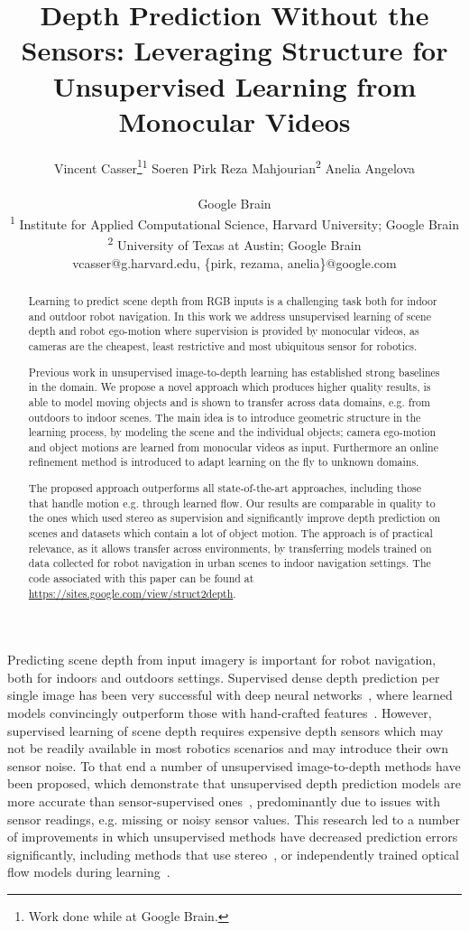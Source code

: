 \documentclass[letterpaper]{article} \usepackage{aaai19}  \usepackage{times}  \usepackage{helvet}  \usepackage{courier}  \usepackage{url}  \usepackage{graphicx}  \frenchspacing
\title{Depth Prediction Without the Sensors: Leveraging Structure for Unsupervised Learning from Monocular Videos}
\author{Vincent Casser\thanks{Work done while at Google Brain.}\textsuperscript{1} \hspace{20pt} Soeren Pirk \hspace{20pt} Reza Mahjourian\textsuperscript{2} \hspace{20pt} Anelia Angelova\\\\
Google Brain\\
\textsuperscript{1} Institute for Applied Computational Science, Harvard University; Google Brain\\
\textsuperscript{2} University of Texas at Austin; Google Brain\\
vcasser@g.harvard.edu, \{pirk, rezama, anelia\}@google.com
}
\begin{document}
\maketitle

\begin{abstract}
Learning to predict scene depth from RGB inputs is a challenging task both for indoor and outdoor robot navigation. In this work we address unsupervised learning of scene depth and robot ego-motion where  supervision is provided by monocular videos, as cameras are the cheapest, least restrictive and most ubiquitous sensor for robotics.

Previous work in unsupervised image-to-depth learning has established strong baselines in the domain. We propose a novel approach which produces higher quality results, is able to model moving objects and is shown to transfer across data domains, e.g. from outdoors to indoor scenes. The main idea is to introduce geometric structure in the learning process, by modeling the scene and the individual objects; camera ego-motion and object motions are learned from monocular videos as input. Furthermore an online refinement method is introduced to adapt learning on the fly to unknown domains.

The proposed approach outperforms all state-of-the-art approaches, including those that handle motion e.g. through learned flow. Our results are comparable in quality to the ones which used stereo as supervision and significantly improve depth prediction on scenes and datasets which contain a lot of object motion. The approach is of practical relevance, as it allows transfer across environments, by transferring models trained on data collected for robot navigation in urban scenes to indoor navigation settings. The code associated with this paper can be found at \url{https://sites.google.com/view/struct2depth}.
\end{abstract}

\noindent Predicting scene depth from input imagery is important for robot navigation, both for indoors and outdoors settings.  
Supervised dense depth prediction per single image has been very successful with deep neural networks~\cite{eigen2014depth,laina2016deeper,Wang2057designing,Li2017two}, where learned models convincingly outperform those with hand-crafted features~\cite{Ladicky2014Discriminatively,Karsch2017depth}. 
However, supervised learning of scene depth requires expensive depth sensors which may not be readily available in most robotics scenarios and may introduce their own sensor noise. To that end a number of unsupervised image-to-depth methods have been proposed, which demonstrate that unsupervised depth prediction models are more accurate than sensor-supervised ones~\cite{zhou2017unsupervised,garg2016unsupervised}, predominantly due to issues with sensor readings, e.g. missing or noisy sensor values. This research led to a number of improvements in which unsupervised methods have decreased prediction errors significantly, including methods that use stereo~\cite{godard2017monodepth}, or independently trained optical flow models during learning~\cite{wang2018learning}.
\end{document}
